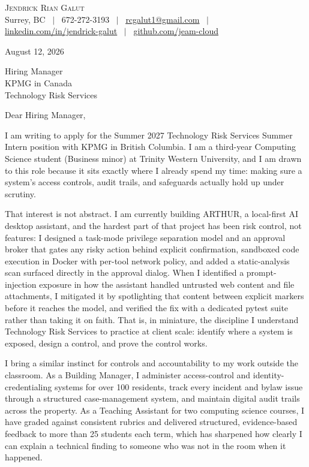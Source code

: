 \documentclass[letterpaper,11pt]{article}
\begin{document}
\begin{center}
    {\LARGE \scshape Jendrick Rian Galut} \\ \vspace{2pt}
    \small Surrey, BC ~$|$~
    672-272-3193 ~$|$~
    \href{mailto:rcgalut1@gmail.com}{\underline{rcgalut1@gmail.com}} ~$|$~
    \href{https://www.linkedin.com/in/jendrick-rian-galut-374310307/}{\underline{linkedin.com/in/jendrick-galut}} ~$|$~
    \href{https://github.com/Jeam-cloud}{\underline{github.com/jeam-cloud}}
\end{center}

\vspace{8pt}

August 12, 2026

Hiring Manager \\
KPMG in Canada \\
Technology Risk Services

Dear Hiring Manager,

I am writing to apply for the Summer 2027 Technology Risk Services Summer Intern position with KPMG in British Columbia. I am a third-year Computing Science student (Business minor) at Trinity Western University, and I am drawn to this role because it sits exactly where I already spend my time: making sure a system's access controls, audit trails, and safeguards actually hold up under scrutiny.

That interest is not abstract. I am currently building ARTHUR, a local-first AI desktop assistant, and the hardest part of that project has been risk control, not features: I designed a task-mode privilege separation model and an approval broker that gates any risky action behind explicit confirmation, sandboxed code execution in Docker with per-tool network policy, and added a static-analysis scan surfaced directly in the approval dialog. When I identified a prompt-injection exposure in how the assistant handled untrusted web content and file attachments, I mitigated it by spotlighting that content between explicit markers before it reaches the model, and verified the fix with a dedicated pytest suite rather than taking it on faith. That is, in miniature, the discipline I understand Technology Risk Services to practice at client scale: identify where a system is exposed, design a control, and prove the control works.

I bring a similar instinct for controls and accountability to my work outside the classroom. As a Building Manager, I administer access-control and identity-credentialing systems for over 100 residents, track every incident and bylaw issue through a structured case-management system, and maintain digital audit trails across the property. As a Teaching Assistant for two computing science courses, I have graded against consistent rubrics and delivered structured, evidence-based feedback to more than 25 students each term, which has sharpened how clearly I can explain a technical finding to someone who was not in the room when it happened.
\end{document}
